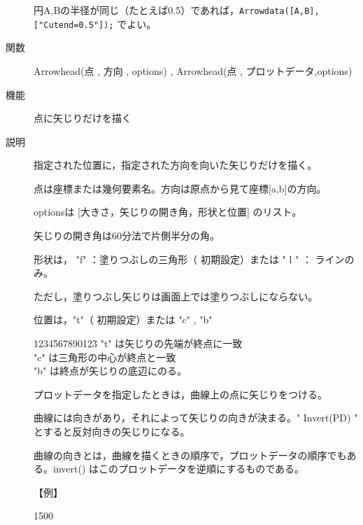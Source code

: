 \documentclass[papersize,a4paper,12pt,uplatex]{jsarticle}
\begin{document}
\begin{description}
円A,Bの半径が同じ（たとえば0.5）であれば，\verb|Arrowdata([A,B],["Cutend=0.5"]);| でよい。

\vspace{\baselineskip}
\hypertarget{arrowhead}{}
\item[関数]  Arrowhead(点 , 方向 , options) , Arrowhead(点 , プロットデータ,options)
\item[機能]  点に矢じりだけを描く
\item[説明]  指定された位置に，指定された方向を向いた矢じりだけを描く。

点は座標または幾何要素名。方向は原点から見て座標[a,b]の方向。

optionsは [大きさ，矢じりの開き角，形状と位置] のリスト。

矢じりの開き角は60分法で片側半分の角。

形状は， "f" ：塗りつぶしの三角形（ 初期設定）または  " l " ： ラインのみ。

ただし，塗りつぶし矢じりは画面上では塗りつぶしにならない。 

位置は，"t"（ 初期設定）または "c" , "b"
\begin{tabbing}
1234\=567890123\=\kill
    \>"t" は矢じりの先端が終点に一致\\
    \>"c" は三角形の中心が終点と一致\\
    \>"b" は終点が矢じりの底辺にのる。
\end{tabbing}
プロットデータを指定したときは，曲線上の点に矢じりをつける。

曲線には向きがあり，それによって矢じりの向きが決まる。" Invert(PD) " とすると反対向きの矢じりになる。

曲線の向きとは，曲線を描くときの順序で，プロットデータの順序でもある。invert() はこのプロットデータを逆順にするものである。

\vspace{\baselineskip}

【例】

\vspace{\baselineskip}
\begin{layer}{150}{0}
\end{layer}


\end{description}
\end{document}
